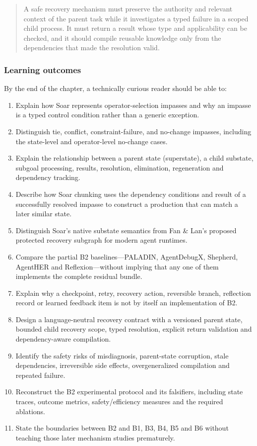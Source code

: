 \begin{quote}
A safe recovery mechanism must preserve the authority and relevant context of the parent task while it investigates a typed failure in a scoped child process. It must return a result whose type and applicability can be checked, and it should compile reusable knowledge only from the dependencies that made the resolution valid.
\end{quote}

\subsubsection{Learning outcomes}\label{learning-outcomes}

By the end of the chapter, a technically curious reader should be able to:

\begin{enumerate}
\def\labelenumi{\arabic{enumi}.}
\tightlist
\item
  Explain how Soar represents operator-selection impasses and why an impasse is a typed control condition rather than a generic exception.
\item
  Distinguish tie, conflict, constraint-failure, and no-change impasses, including the state-level and operator-level no-change cases.
\item
  Explain the relationship between a parent state (superstate), a child substate, subgoal processing, results, resolution, elimination, regeneration and dependency tracking.
\item
  Describe how Soar chunking uses the dependency conditions and result of a successfully resolved impasse to construct a production that can match a later similar state.
\item
  Distinguish Soar's native substate semantics from Fan \& Lan's proposed protected recovery subgraph for modern agent runtimes.
\item
  Compare the partial B2 baselines---PALADIN, AgentDebugX, Shepherd, AgentHER and Reflexion---without implying that any one of them implements the complete residual bundle.
\item
  Explain why a checkpoint, retry, recovery action, reversible branch, reflection record or learned feedback item is not by itself an implementation of B2.
\item
  Design a language-neutral recovery contract with a versioned parent state, bounded child recovery scope, typed resolution, explicit return validation and dependency-aware compilation.
\item
  Identify the safety risks of misdiagnosis, parent-state corruption, stale dependencies, irreversible side effects, overgeneralized compilation and repeated failure.
\item
  Reconstruct the B2 experimental protocol and its falsifiers, including state traces, outcome metrics, safety/efficiency measures and the required ablations.
\item
  State the boundaries between B2 and B1, B3, B4, B5 and B6 without teaching those later mechanism studies prematurely.
\end{enumerate}

